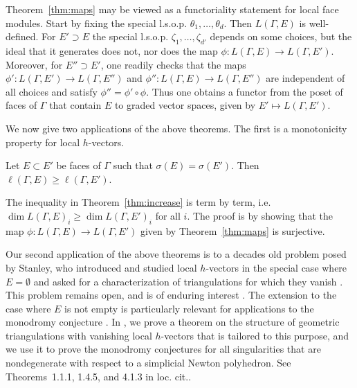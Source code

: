 \documentclass[ALCO, Unicode,published]{cedram}
\begin{document}
\begin{remark}
Theorem~\ref{thm:maps} may be viewed as a functoriality statement for local face modules. Start by fixing the special l.s.o.p. $\theta_1, \ldots, \theta_d$.  Then $L(\Gamma, E)$ is well-defined. For $E' \supset E$ the special l.s.o.p. $\zeta_1, \ldots, \zeta_{d'}$ depends on some choices, but the ideal that it generates does not, nor does the map $\phi \colon L(\Gamma,E) \to L(\Gamma,E')$.  Moreover, for $E'' \supset E'$, one readily checks that the maps $\phi' \colon L(\Gamma, E') \to L(\Gamma, E'')$ and $\phi '' \colon L(\Gamma,E) \to L(\Gamma, E'')$ are independent of all choices and satisfy $\phi'' = \phi' \circ \phi$.  Thus one obtains a functor from the poset of faces of $\Gamma$ that contain $E$ to graded vector spaces, given by $E' \mapsto L(\Gamma, E')$.
\end{remark}

We now give two applications of the above theorems. The first is a monotonicity property for local $h$-vectors.

\begin{theorem}\label{thm:increase} 
Let $E \subset E'$ be faces of $\Gamma$ such that $\sigma(E) = \sigma(E')$. Then $\ell (\Gamma, E) \geq \ell(\Gamma, E')$.
\end{theorem}

The inequality in Theorem~\ref{thm:increase} is term by term, i.e. $\dim L(\Gamma, E)_i \geq \dim L(\Gamma,E')_i$ for all $i$. The proof is by showing that the map $\phi \colon L(\Gamma, E) \to L(\Gamma,E')$ given by Theorem~\ref{thm:maps} is surjective.


Our second application of the above theorems is to a decades old problem posed by Stanley, who introduced and studied local $h$-vectors in the special case where $E = \emptyset$ and asked for a characterization of triangulations for which they vanish \cite[Problem~4.13]{Stanley92}. This problem remains open, and is of enduring interest \cite[Problem~2.12]{Athanasiadis16}. The extension to the case where $E$ is not empty is particularly relevant for applications to the monodromy conjecture \cite{Igusa78, DenefLoeser98, Stapledon17}. In \cite{LarsonPayneStapledon}, we prove a theorem on the structure of geometric triangulations with vanishing local $h$-vectors that is tailored to this purpose, and we use it to prove the monodromy conjectures for all singularities that are nondegenerate with respect to a simplicial Newton polyhedron.  See Theorems~1.1.1, 1.4.5, and 4.1.3 in loc. cit..
\end{document}
